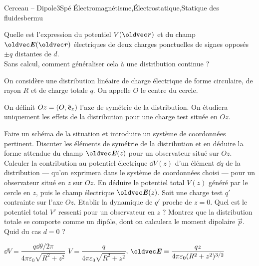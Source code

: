 
\begin{exercise}{Cerceau -- Dipole}{3}{Spé}
{\'Electromagnétisme,\'Electrostatique,Statique des fluides}{bermu}

\begin{questions}
    \questioncours Quelle est l'expression du potentiel $V(\vr)$ et du champ $\vE(\vr)$ électriques de deux charges ponctuelles de signes opposés $\pm q$ distantes de $d$. \\
    Sans calcul, comment généraliser cela à une distribution continue ?
\begin{EnvUplevel}

On considère une distribution linéaire de charge électrique de forme circulaire, de rayon $R$ et de charge totale $q$. On appelle $O$ le centre du cercle. 

On définit $Oz = (O, \hat{\bm{\mathit{e}}}_z)$ l'axe de symétrie de la distribution. On étudiera uniquement les effets de la distribution pour une charge test située en $Oz$.
\end{EnvUplevel}
    \question Faire un schéma de la situation et introduire un système de coordonnées pertinent.
    \question Discuter les éléments de symétrie de la distribution et en déduire la forme attendue du champ $\vE(z)$ pour un observateur situé sur $Oz$.
    \question Calculer la contribution au potentiel électrique $\dd{V}(z)$ d'un élément $\dd{q}$ de la distribution --- qu'on exprimera dans le système de coordonnées choisi --- pour un observateur situé en $z$ sur $Oz$.
    \question En déduire le potentiel total $V(z)$ généré par le cercle en $z$, puis le champ électrique $\vE(z)$.
    \question Soit une charge test $q'$ contrainte sur l'axe $Oz$. Etablir la dynamique de $q'$ proche de $z = 0$.
    \question Quel est le potentiel total $V'$ ressenti pour un observateur en $z$ ?
    \question Montrez que la distribution totale se comporte comme un dipôle, dont on calculera le moment dipolaire $\vec{p}$.
    \question Quid du cas $d = 0$ ?
\end{questions}


\end{exercise}

\begin{solution}
\begin{questions}
    \questioncours 
    \question
    \question
    \question $\dd{V} = \dfrac{q\dd{\theta}/2\pi}{4\pi\varepsilon_0 \sqrt{R^2 + z^2}}$
    \question $V = \dfrac{q}{4\pi\varepsilon_0 \sqrt{R^2 + z^2}}$, $\vE = \dfrac{q z}{4\pi\varepsilon_0 (R^2 + z^2)^{3/2}}$
\end{questions}
\end{solution}